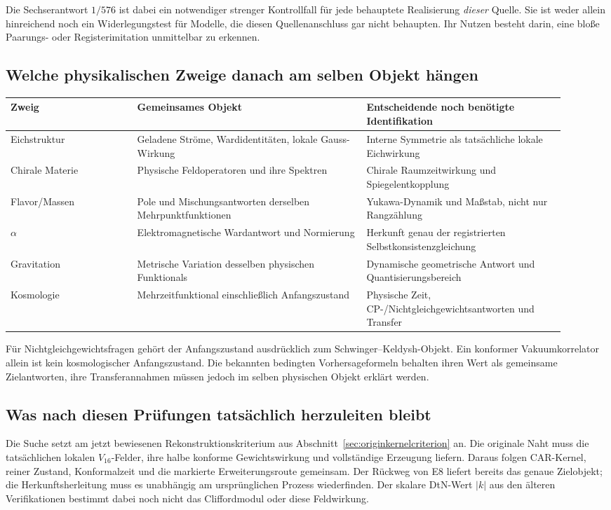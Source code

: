 Die Sechserantwort $1/576$ ist dabei ein notwendiger strenger Kontrollfall für jede behauptete Realisierung \emph{dieser} Quelle. Sie ist weder allein hinreichend noch ein Widerlegungstest für Modelle, die diesen Quellenanschluss gar nicht behaupten. Ihr Nutzen besteht darin, eine bloße Paarungs- oder Registerimitation unmittelbar zu erkennen.

\subsection{Welche physikalischen Zweige danach am selben Objekt hängen}
\begin{longtable}{L{0.21\linewidth}L{0.38\linewidth}L{0.33\linewidth}}
\toprule
Zweig & Gemeinsames Objekt & Entscheidende noch benötigte Identifikation\\\midrule\endhead
Eichstruktur & Geladene Ströme, Wardidentitäten, lokale Gauss-Wirkung & Interne Symmetrie als tatsächliche lokale Eichwirkung\\
Chirale Materie & Physische Feldoperatoren und ihre Spektren & Chirale Raumzeitwirkung und Spiegelentkopplung\\
Flavor/Massen & Pole und Mischungsantworten derselben Mehrpunktfunktionen & Yukawa-Dynamik und Maßstab, nicht nur Rangzählung\\
$\alpha$ & Elektromagnetische Wardantwort und Normierung & Herkunft genau der registrierten Selbstkonsistenzgleichung\\
Gravitation & Metrische Variation desselben physischen Funktionals & Dynamische geometrische Antwort und Quantisierungsbereich\\
Kosmologie & Mehrzeitfunktional einschließlich Anfangszustand & Physische Zeit, CP-/Nichtgleichgewichtsantworten und Transfer\\\bottomrule
\end{longtable}

Für Nichtgleichgewichtsfragen gehört der Anfangszustand ausdrücklich zum Schwinger--Keldysh-Objekt. Ein konformer Vakuumkorrelator allein ist kein kosmologischer Anfangszustand. Die bekannten bedingten Vorhersageformeln behalten ihren Wert als gemeinsame Zielantworten, ihre Transferannahmen müssen jedoch im selben physischen Objekt erklärt werden.

\subsection{Was nach diesen Prüfungen tatsächlich herzuleiten bleibt}
Die Suche setzt am jetzt bewiesenen Rekonstruktionskriterium aus Abschnitt~\ref{sec:originkernelcriterion} an. Die originale Naht muss die tatsächlichen lokalen $V_{16}$-Felder, ihre halbe konforme Gewichtswirkung und vollständige Erzeugung liefern. Daraus folgen CAR-Kernel, reiner Zustand, Konformalzeit und die markierte Erweiterungsroute gemeinsam. Der Rückweg von E8 liefert bereits das genaue Zielobjekt; die Herkunftsherleitung muss es unabhängig am ursprünglichen Prozess wiederfinden. Der skalare DtN-Wert $|k|$ aus den älteren Verifikationen bestimmt dabei noch nicht das Cliffordmodul oder diese Feldwirkung.

